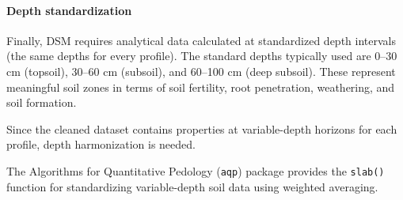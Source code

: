 \documentclass[
  10pt,
  b5paper,
  oneside]{book}
\begin{document}
\paragraph*{Depth standardization}\label{depth-standardization}

Finally, DSM requires analytical data calculated at standardized depth intervals (the same depths for every profile). The standard depths typically used are 0--30 cm (topsoil), 30--60 cm (subsoil), and 60--100 cm (deep subsoil). These represent meaningful soil zones in terms of soil fertility, root penetration, weathering, and soil formation.

Since the cleaned dataset contains properties at variable-depth horizons for each profile, depth harmonization is needed.

The Algorithms for Quantitative Pedology (\texttt{aqp}) package provides the \texttt{slab()} function for standardizing variable-depth soil data using weighted averaging.
\end{document}

